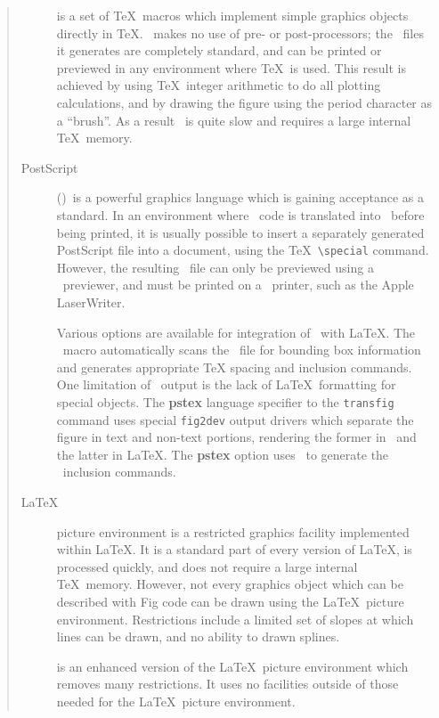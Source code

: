 \begin{quote}
\begin{description}
\item[\PicTeX]
	is a set of \TeX\ macros which implement simple
		graphics objects directly in \TeX.
	\PicTeX\ makes no use of pre- or post-processors; the \DVI\ files it
		generates are completely standard, and can be printed or
		previewed in any environment where \TeX\ is used.
	This result is achieved by using \TeX\ integer arithmetic to
		do all plotting calculations, and by drawing the figure
		using the period character as a ``brush''.
	As a result \PicTeX\ is quite slow and requires a large internal
		\TeX\ memory.

\item[PostScript]
	(\PS)\, is a powerful graphics language which is gaining
		acceptance as a standard.
	In an environment where \DVI\ code is translated into \PS\ before
		being printed, it is usually possible to insert a
		separately generated PostScript file into a
		document, using the \TeX\ {\verb|\special|} command.
	However, the resulting \PS\ file can only be previewed using a
		\PS\ previewer, and must be printed on a \PS\ printer,
		such as the Apple LaserWriter.

	Various options are available for integration of \PS\ with \LaTeX.
	The \psfig\ macro automatically scans the \PS\ file for bounding box
		information and generates appropriate TeX spacing and inclusion
		commands.
	One limitation of \PS\ output is the lack of \LaTeX\ formatting for
		special objects.
	The {\bf pstex} language specifier to the {\tt transfig} command
		uses special {\tt fig2dev} output drivers which separate
		the figure in text and non-text portions, rendering the
		former in \PS\ and the latter in \LaTeX.
	The {\bf pstex} option uses \psfig\ to generate the \PS\ inclusion
		commands.

\item[\LaTeX]
	picture environment is a restricted graphics facility implemented
		within \LaTeX.
	It is a standard part of every version of \LaTeX, is processed
		quickly, and does not require a large internal \TeX\ memory.
	However, not every graphics object which can be described with
		 Fig code can be drawn using the \LaTeX\ picture environment.
	Restrictions include a limited set of slopes at which lines can be
		drawn, and no ability to drawn splines.

\item[\EPIC]
	is an enhanced version of the \LaTeX\ picture environment which
		removes many restrictions.
	It uses no facilities outside of those needed for the
		\LaTeX\ picture environment.


\end{description}
\end{quote}
